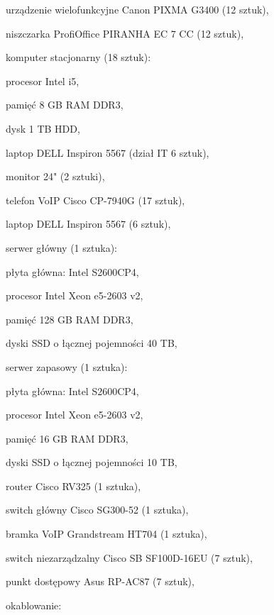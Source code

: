 \begin{minipage}[\right]{15cm}
\begin{itemize*}
	\item urządzenie wielofunkcyjne Canon PIXMA G3400 (12 sztuk),
	\item niszczarka ProfiOffice PIRANHA EC 7 CC (12 sztuk),
	\item komputer stacjonarny (18 sztuk):
	\begin{itemize*}
		\item procesor Intel i5,
		\item pamięć 8 GB RAM DDR3,
		\item dysk 1 TB HDD,
	\end{itemize*}
	\item laptop DELL Inspiron 5567 (dział IT 6 sztuk),
	\item monitor 24" (2 sztuki),
	\item telefon VoIP Cisco CP-7940G (17 sztuk),
	\item laptop DELL Inspiron 5567 (6 sztuk),
	\item serwer główny (1 sztuka):
	\begin{itemize*}
		\item płyta główna: Intel S2600CP4,
		\item procesor Intel Xeon e5-2603 v2,
		\item pamięć 128 GB RAM DDR3,
		\item dyski SSD o łącznej pojemności 40 TB, 
	\end{itemize*}
	\item serwer zapasowy (1 sztuka):
	\begin{itemize*}
		\item płyta główna: Intel S2600CP4,
		\item procesor Intel Xeon e5-2603 v2,
		\item pamięć 16 GB RAM DDR3,
		\item dyski SSD o łącznej pojemności 10 TB, 
	\end{itemize*}
	\item router Cisco RV325 (1 sztuka),
	\item switch główny Cisco SG300-52 (1 sztuka),
	\item bramka VoIP Grandstream HT704 (1 sztuka),
	\item switch niezarządzalny Cisco SB SF100D-16EU (7 sztuk),
	\item punkt dostępowy Asus RP-AC87 (7 sztuk),
	\item okablowanie:
	\begin{itemize*}

\end{itemize*}
\end{itemize*}
\end{minipage}
